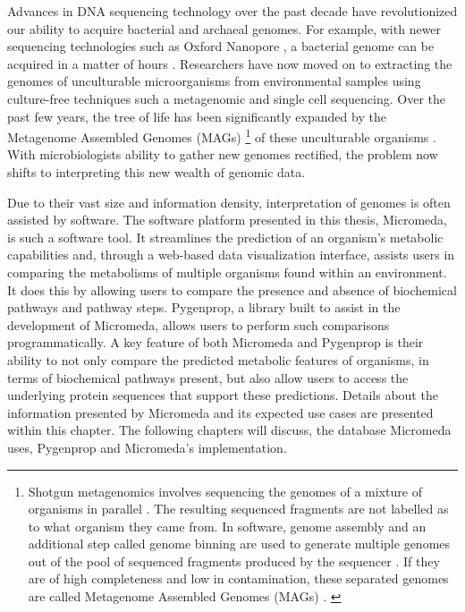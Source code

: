 Advances in DNA sequencing technology over the past decade have revolutionized our ability to acquire bacterial and archaeal genomes. For example, with newer sequencing technologies such as Oxford Nanopore \cite{jain2016oxford}, a bacterial genome can be acquired in a matter of hours \cite{Lu2016,Cao2017}. Researchers have now moved on to extracting the genomes of unculturable microorganisms from environmental samples using culture-free techniques such a metagenomic \cite{quince2017shotgun} and single cell \cite{gawad2016single} sequencing. Over the past few years, the tree of life has been significantly expanded by the Metagenome Assembled Genomes (MAGs) \footnote{Shotgun metagenomics involves sequencing the genomes of a mixture of organisms in parallel \cite{quince2017shotgun}. The resulting sequenced fragments are not labelled as to what organism they came from. In software, genome assembly and an additional step called genome binning are used to generate multiple genomes out of the pool of sequenced fragments produced by the sequencer \cite{quince2017shotgun, sangwan2016recovering}. If they are of high completeness and low in contamination, these separated genomes are called Metagenome Assembled Genomes (MAGs)  \cite{sangwan2016recovering}. \label{metagenomics-footnote}} of these unculturable organisms \cite{Hug2016,Parks2017}. With microbiologists ability to gather new genomes rectified, the problem now shifts to interpreting this new wealth of genomic data. 

Due to their vast size and information density, interpretation of genomes is often assisted by software. The software platform presented in this thesis, Micromeda, is such a software tool. It streamlines the prediction of an organism's metabolic capabilities and, through a web-based data visualization interface, assists users in comparing the metabolisms of multiple organisms found within an environment. It does this by allowing users to compare the presence and absence of biochemical pathways and pathway steps. Pygenprop, a library built to assist in the development of Micromeda, allows users to perform such comparisons programmatically. A key feature of both Micromeda and Pygenprop is their ability to not only compare the predicted metabolic features of organisms, in terms of biochemical pathways present, but also allow users to access the underlying protein sequences that support these predictions. Details about the information presented by Micromeda and its expected use cases are presented within this chapter. The following chapters will discuss, the database Micromeda uses, Pygenprop and Micromeda's implementation.

